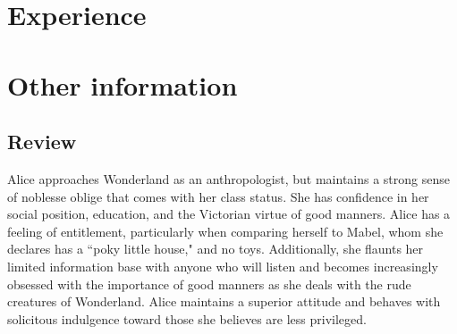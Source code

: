 \documentclass[letterpaper]{twentysecondcv} %
\begin{document}
\section{Experience}

\begin{twenty} %
\end{twenty}


\section{Other information}

\subsection{Review}

Alice approaches Wonderland as an anthropologist, but maintains a strong sense of noblesse oblige that comes with her class status. She has confidence in her social position, education, and the Victorian virtue of good manners. Alice has a feeling of entitlement, particularly when comparing herself to Mabel, whom she declares has a ``poky little house," and no toys. Additionally, she flaunts her limited information base with anyone who will listen and becomes increasingly obsessed with the importance of good manners as she deals with the rude creatures of Wonderland. Alice maintains a superior attitude and behaves with solicitous indulgence toward those she believes are less privileged.

\end{document}
